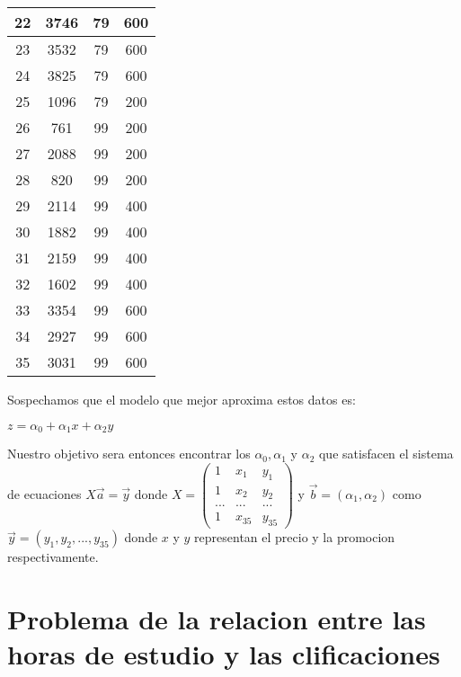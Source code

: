 \documentclass{article}
\begin{document}
\begin{table}
\begin{tabular}{|c|c|c|c|}
    22 & 3746 & 79 & 600 \\ \hline
    23 & 3532 & 79 & 600 \\ \hline
    24 & 3825 & 79 & 600 \\ \hline
    25 & 1096 & 79 & 200 \\ \hline
    26 & 761 & 99 & 200 \\ \hline
    27 & 2088 & 99 & 200 \\ \hline
    28 & 820 & 99 & 200 \\ \hline
    29 & 2114 & 99 & 400 \\ \hline
    30 & 1882 & 99 & 400 \\ \hline
    31 & 2159 & 99 & 400 \\ \hline
    32 & 1602 & 99 & 400 \\ \hline
    33 & 3354 & 99 & 600 \\ \hline
    34 & 2927 & 99 & 600 \\ \hline
    35 & 3031 & 99 & 600 \\ \hline
    \end{tabular}
\end{table}

Sospechamos que el modelo que mejor aproxima estos datos es:

\begin{center}
    $z = \alpha_0 + \alpha_1 x + \alpha_2 y$
\end{center}

Nuestro objetivo sera entonces encontrar los $\alpha_0 , \alpha_1$ y $\alpha_2$ que satisfacen el sistema de ecuaciones
$X \vec{a} = \vec{y}$ donde $X = \begin{pmatrix} 1 & x_1 & y_1 \\ 1 & x_2 & y_2 \\ ... & ... & ... \\ 1 & x_35 & y_35 \end{pmatrix}$
y $\vec{b} = (\alpha_1, \alpha_2)$ como $\vec{y} = (y_1,y_2,...,y_35)$ donde $x$ y $y$ representan el precio y la promocion respectivamente.

\section{Problema de la relacion entre las horas de estudio y las clificaciones}
\end{document}
